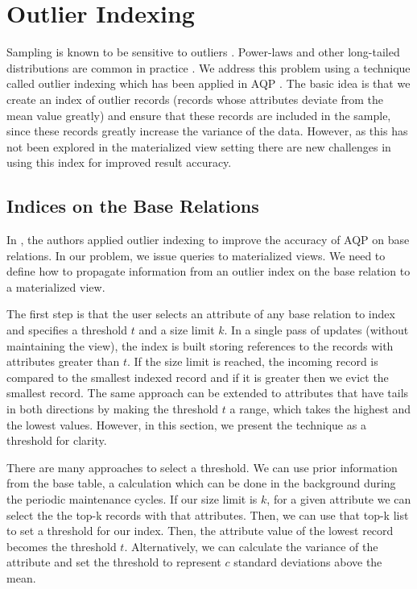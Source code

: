 \vspace{-.5em}
\section{Outlier Indexing}\label{outlier}
Sampling is known to be sensitive to outliers \cite{clauset2009power, chaudhuri2001overcoming}.
Power-laws and other long-tailed distributions are common in practice \cite{clauset2009power}.
We address this problem using a technique called outlier indexing which has been applied in AQP \cite{chaudhuri2001overcoming}.
The basic idea is that we create an index of outlier records (records whose attributes deviate from the mean value greatly) and ensure that these records are included in the sample, since these records greatly increase the variance of the data. 
However, as this has not been explored in the materialized view setting there are new challenges in using this index for improved result accuracy.

\subsection{Indices on the Base Relations}
In \cite{chaudhuri2001overcoming}, the authors applied outlier indexing to improve the accuracy of AQP on base relations.
In our problem, we issue queries to materialized views.
We need to define how to propagate information from an outlier index on the base relation to a materialized view.

The first step is that the user selects an attribute of any base relation to index and specifies a threshold $t$ and a size limit $k$.
In a single pass of updates (without maintaining the view), the index is built storing references to the records with attributes greater than $t$.
If the size limit is reached, the incoming record is compared to the smallest indexed record and if it is greater then we evict the smallest record.
The same approach can be extended to attributes that have tails in both directions by making the threshold $t$ a range, which takes the highest and the lowest values.
However, in this section, we present the technique as a threshold for clarity.

There are many approaches to select a threshold.
We can use prior information from the base table, a calculation which can be done in the background during the periodic maintenance cycles.
If our size limit is $k$, for a given attribute we can select the the top-k records with that attributes.
Then, we can use that top-k list to set a threshold for our index. 
Then, the attribute value of the lowest record becomes the threshold $t$.
Alternatively, we can calculate the variance of the attribute and set the threshold to represent $c$ standard deviations above the mean.

